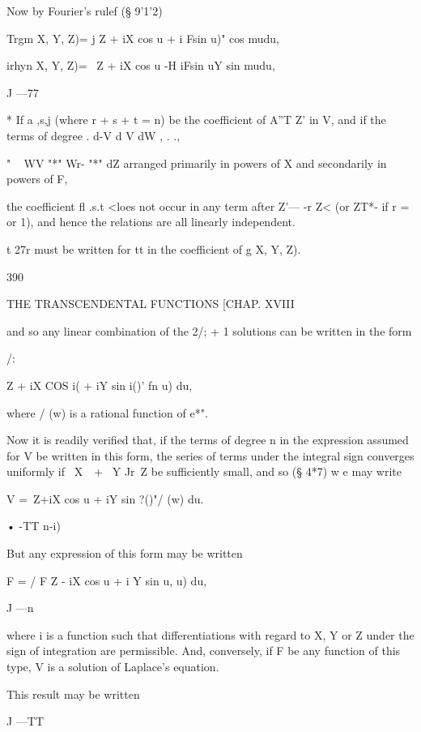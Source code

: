 Now by Fourier's rulef (§ 9'1'2)

Trgm X, Y, Z)= j Z + iX cos u + i Fsin u)" cos mudu,

irhyn X, Y, Z)= \ Z + iX cos u -H iFsin uY sin mudu,

J —77

* If a ,s,j (where r + s + t = n) be the coefficient of A''T Z' in V,
and if the terms of degree . d-V d V dW , . .,

" ~ WV "*" Wr- "*" dZ arranged primarily in powers of X and
secondarily in powers of F,

the coefficient fl .s.t <loes not occur in any term after Z'— -r Z<
(or ZT*- if r = or 1), and hence the relations are all linearly
independent.

t 27r must be written for tt in the coefficient of g X, Y, Z).



390



THE TRANSCENDENTAL FUNCTIONS [CHAP. XVIII



and so any linear combination of the 2/; + 1 solutions can be written
in the form



/:



 Z + iX COS i( + iY sin i()' fn u) du,

where / (w) is a rational function of e*".

Now it is readily verified that, if the terms of degree n in the
expression assumed for V be written in this form, the series of terms
under the integral sign converges uniformly if \ X\ \ + \ Y Jr\ Z be
sufficiently small, and so (§ 4*7) w e may write

V =\ Z+iX cos u + iY sin ?()"/ (w) du.

• -TT n-i)

But any expression of this form may be written

F = / F Z - iX cos u + i Y sin u, u) du,

J —n

where i is a function such that differentiations with regard to X, Y
or Z under the sign of integration are permissible. And, conversely,
if F be any function of this type, V is a solution of Laplace's
equation.

This result may be written



J —TT




